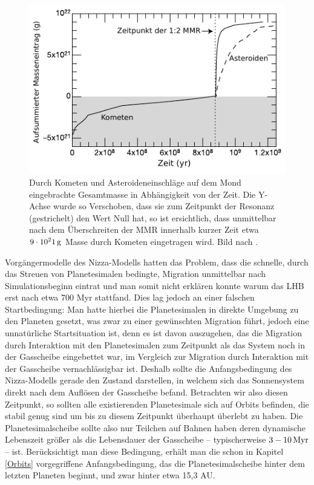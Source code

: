 \documentclass[12pt,a4paper,twoside]{article}
\renewcommand{\cite}{\citep}
\begin{document}
\begin{figure}
\centering 
\includegraphics[scale=1]{img/Gomes2005-3}
\caption{Durch Kometen und Asteroideneinschläge auf dem Mond eingebrachte Gesamtmasse in Abhängigkeit von der Zeit. Die Y-Achse wurde so Verschoben, dass sie zum Zeitpunkt der Resonanz (gestrichelt) den Wert Null hat, so ist ersichtlich, dass unmittelbar nach dem Überschreiten der MMR innerhalb kurzer Zeit etwa $\unit[9\cdot10^21]{g}$ Masse durch Kometen eingetragen wird. Bild nach \cite{Gomes2005}.}
\label{fig:LHBMasse}
\end{figure}
Vorgängermodelle des Nizza-Modells hatten das Problem, dass die schnelle, durch das Streuen von Planetesimalen bedingte, Migration unmittelbar nach Simulationsbeginn eintrat und man somit nicht erklären konnte warum das LHB erst nach etwa 700 Myr stattfand.
Dies lag jedoch an einer falschen Startbedingung: Man hatte hierbei die Planetesimalen in direkte Umgebung zu den Planeten gesetzt, was zwar zu einer gewünschten Migration führt, jedoch eine unnatürliche Startsituation ist,
denn es ist davon auszugehen, das die Migration durch Interaktion mit den Planetesimalen zum Zeitpunkt als das System noch in der Gasscheibe eingebettet war, im Vergleich zur Migration durch Interaktion mit der Gasscheibe vernachlässigbar ist.
Deshalb sollte die Anfangsbedingung des Nizza-Modells gerade den Zustand darstellen, in welchem sich das Sonnensystem direkt nach dem Auflösen der Gasscheibe befand. Betrachten wir also diesen Zeitpunkt, so sollten alle existierenden Planetesimale sich auf Orbits befinden, die stabil genug sind um bis zu diesem Zeitpunkt überhaupt überlebt zu haben.
Die Planetesimalscheibe sollte also nur Teilchen auf Bahnen haben deren dynamische Lebenszeit größer als die Lebensdauer der Gasscheibe – typischerweise $\unit[3-10]{Myr}$\cite{Haisch2001} – ist\cite{Gomes2005}.
Berücksichtigt man diese Bedingung, erhält man die schon in Kapitel \ref{Orbits} vorgegriffene Anfangsbedingung, das die Planetesimalscheibe hinter dem letzten Planeten beginnt, und zwar hinter etwa 15,3 AU\cite{Gomes2005}.
\end{document}

